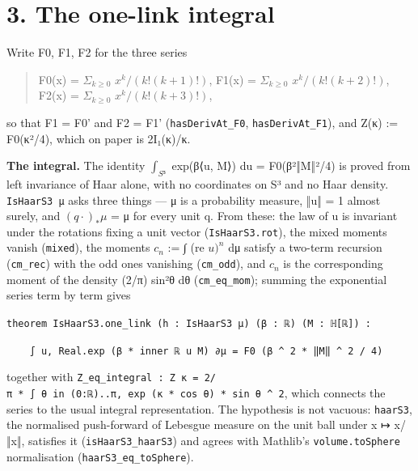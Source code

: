 \documentclass[11pt,a4paper]{article}
\theoremstyle{named}
\begin{document}
\section*{3. The one-link integral}
Write F0, F1, F2 for the three series

\begin{quote}
F0(x) = $Σ_{k≥0}$ $x^k/(k!(k+1)!)$,  F1(x) = $Σ_{k≥0}$ $x^k/(k!(k+2)!)$,  F2(x) = $Σ_{k≥0}$ $x^k/(k!(k+3)!)$,
\end{quote}
so that F1 = F0' and F2 = F1' (\texttt{hasDerivAt\_\allowbreak{}F0}, \texttt{hasDerivAt\_\allowbreak{}F1}), and Z(κ) := F0(κ²/4), which on paper is 2I₁(κ)/κ.

\textbf{The integral.} The identity $∫_{S³}$ exp(β⟨u, M⟩) du = F0(β²‖M‖²/4) is proved from left invariance of Haar alone, with no coordinates on S³ and no Haar density. \texttt{IsHaarS3\ \allowbreak{}μ} asks three things — μ is a probability measure, ‖u‖ = 1 almost surely, and $(q·)_*μ$ = μ for every unit q. From these: the law of u is invariant under the rotations fixing a unit vector (\texttt{IsHaarS3.\allowbreak{}rot}), the mixed moments vanish (\texttt{mixed}), the moments $c_n$ := ∫ (re $u)^n$ dμ satisfy a two-term recursion (\texttt{cm\_\allowbreak{}rec}) with the odd ones vanishing (\texttt{cm\_\allowbreak{}odd}), and $c_n$ is the corresponding moment of the density (2/π) sin²θ dθ (\texttt{cm\_\allowbreak{}eq\_\allowbreak{}mom}); summing the exponential series term by term gives

\begin{leancode}
\item \texttt{theorem\ \allowbreak{}IsHaarS3.\allowbreak{}one\_\allowbreak{}link\ \allowbreak{}(h\ \allowbreak{}:\ \allowbreak{}IsHaarS3\ \allowbreak{}μ)\ \allowbreak{}(β\ \allowbreak{}:\ \allowbreak{}ℝ)\ \allowbreak{}(M\ \allowbreak{}:\ \allowbreak{}ℍ[ℝ])\ \allowbreak{}:}
\item \texttt{\ \allowbreak{}\ \allowbreak{}\ \allowbreak{}\ \allowbreak{}∫\ \allowbreak{}u,\ \allowbreak{}Real.\allowbreak{}exp\ \allowbreak{}(β\ \allowbreak{}*\ \allowbreak{}inner\ \allowbreak{}ℝ\ \allowbreak{}u\ \allowbreak{}M)\ \allowbreak{}∂μ\ \allowbreak{}=\ \allowbreak{}F0\ \allowbreak{}(β\ \allowbreak{}\textasciicircum{}\ \allowbreak{}2\ \allowbreak{}*\ \allowbreak{}‖M‖\ \allowbreak{}\textasciicircum{}\ \allowbreak{}2\ \allowbreak{}/\ \allowbreak{}4)}
\end{leancode}
together with \texttt{Z\_\allowbreak{}eq\_\allowbreak{}integral\ \allowbreak{}:\ \allowbreak{}Z\ \allowbreak{}κ\ \allowbreak{}=\ \allowbreak{}2/π\ \allowbreak{}*\ \allowbreak{}∫\ \allowbreak{}θ\ \allowbreak{}in\ \allowbreak{}(0:ℝ).\allowbreak{}.\allowbreak{}π,\ \allowbreak{}exp\ \allowbreak{}(κ\ \allowbreak{}*\ \allowbreak{}cos\ \allowbreak{}θ)\ \allowbreak{}*\ \allowbreak{}sin\ \allowbreak{}θ\ \allowbreak{}\textasciicircum{}\ \allowbreak{}2}, which connects the series to the usual integral representation. The hypothesis is not vacuous: \texttt{haarS3}, the normalised push-forward of Lebesgue measure on the unit ball under x ↦ x/‖x‖, satisfies it (\texttt{isHaarS3\_\allowbreak{}haarS3}) and agrees with Mathlib's \texttt{volume.\allowbreak{}toSphere} normalisation (\texttt{haarS3\_\allowbreak{}eq\_\allowbreak{}toSphere}).
\end{document}
